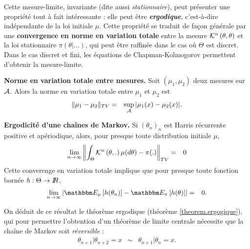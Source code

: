 \noindent Cette mesure-limite, invariante (dite aussi \emph{stationnaire}), peut présenter une propriété tout à fait intéressante : elle peut être \emph{\bf ergodique}, c'est-à-dire indépendante de la loi initiale $\mu$. Cette propriété se traduit de fa\c con générale par une {\bf convergence en norme en variation totale} entre la mesure ${\cal{K}}^n\left(\theta,\theta\right)$ et la loi stationnaire $\pi(\theta|...)$, qui peut être raffinée dans le cas où $\Theta$ est discret. Dans le cas discret et fini, les équations de Chapman-Kolmogorov permettent d'obtenir la mesure-limite. \\

\begin{definition}{\bf Norme en variation totale entre mesures.}
Soit $(\mu_1,\mu_2)$ deux mesures sur ${\cal{A}}$. Alors la norme en variation totale entre $\mu_1$ et $\mu_2$ est
\begin{eqnarray*}
\|\mu_1-\mu_2\|_{TV} & = & \sup\limits_{\cal{A}} |\mu_1(x)-\mu_2(x)|.
\end{eqnarray*}
\end{definition}

\begin{theorem}{\bf Ergodicité d'une chaînes de Markov.}
Si $(\theta_n)_n$ est Harris récurrente positive et apériodique, alors, pour presque toute distribution initiale $\mu$,
\begin{eqnarray*}
\lim\limits_{n\to\infty} \left\| \int_{\Theta} {\cal{K}}^n\left(\theta,.\right)\mu(d\theta) - \pi(.) \right\|_{TV} & = & 0
\end{eqnarray*}
Cette converenge en variation totale implique que pour presque toute fonction bornée $h:\Theta\to I\!\!R$, 
\begin{eqnarray*}
\lim\limits_{n\to\infty} \left| \E_{\mu}\left[h(\theta_n)\right] - \E_{\pi}\left[h(\theta)\right]\right| & = & 0.
\end{eqnarray*}
\end{theorem}

On déduit de ce résultat le théorème ergodique (théorème \ref{theorem.ergogique}), qui pour permettre l'obtention d'un théorème de limite centrale nécessite que la chaîne de Markov soit \emph{réversible} :
\begin{eqnarray*}
\theta_{n+1}|\theta_{n+2}=x & \sim & \theta_{n+1}|\theta_{n}=x.
\end{eqnarray*}